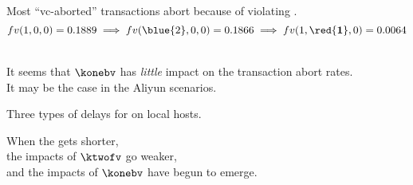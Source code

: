\begin{frame}{}

  \pause
  Most ``vc-aborted'' transactions abort because of violating \red{$\ktwofv$}.
  \[
    fv(1,0,0) = 0.1889 \implies fv(\blue{2},0,0) = 0.1866 \implies fv(1,\red{\bf 1},0) = 0.0064
  \]
\end{frame}

\begin{frame}{}
  \begin{center}
     \\[10pt]
    It seems that $\konebv$ has \emph{little} impact on the transaction abort rates. \\[30pt]
    \pause
    It may be the case in the Aliyun scenarios. \\[10pt]
  \end{center}
\end{frame}

\begin{frame}{}
  \centerline{Three types of delays for  on local hosts.}
  
\end{frame}

\begin{frame}{}

  \begin{center}
    When the  gets shorter, \\
    the impacts of $\ktwofv$ go weaker, \\
    and the impacts of $\konebv$ have begun to emerge.
  \end{center}
\end{frame}

